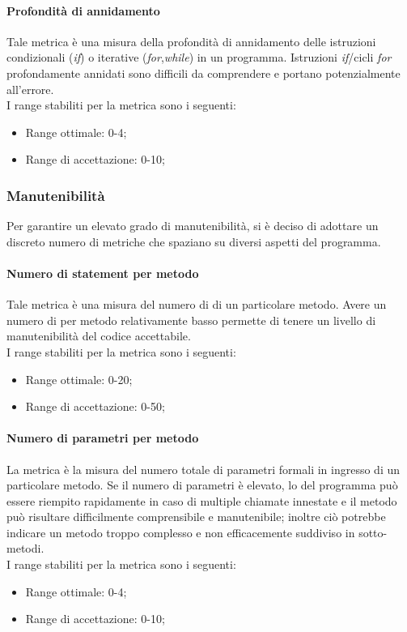 			\paragraph[Profondità di annidamento]{\hypertarget{pa}{Profondità di annidamento}}
			Tale metrica è una misura della profondità di annidamento delle istruzioni condizionali (\textit{if}) o iterative (\textit{for},\textit{while}) in un programma. Istruzioni \textit{if}/cicli \textit{for} profondamente annidati sono difficili da comprendere e portano potenzialmente all'errore.
			\\I range stabiliti per la metrica sono i seguenti:
			\begin{itemize}
				\item Range ottimale: 0-4;
				\item Range di accettazione: 0-10;
			\end{itemize}

		\subsubsection{Manutenibilità \label{S4}}
		Per garantire un elevato grado di manutenibilità, si è deciso di adottare un discreto numero di metriche che spaziano su diversi aspetti del programma.
			\paragraph[Numero di statement per metodo]{\hypertarget{nsm}{Numero di statement per metodo}}
			Tale metrica è una misura del numero di  di un particolare metodo. Avere un numero di  per metodo relativamente basso permette di tenere un livello di manutenibilità del codice accettabile.
			\\I range stabiliti per la metrica sono i seguenti:
			\begin{itemize}
				\item Range ottimale: 0-20;
				\item Range di accettazione: 0-50;
			\end{itemize}
			
			\paragraph[Numero di parametri per metodo]{\hypertarget{npm}{Numero di parametri per metodo}}
			La metrica è la misura del numero totale di parametri formali in ingresso di un particolare metodo. Se il numero di parametri è elevato, lo  del programma può essere riempito rapidamente in caso di multiple chiamate innestate e il metodo può risultare difficilmente comprensibile e manutenibile; inoltre ciò potrebbe indicare un metodo troppo complesso e non efficacemente suddiviso in sotto-metodi.
			\\I range stabiliti per la metrica sono i seguenti:
			\begin{itemize}
				\item Range ottimale: 0-4;
				\item Range di accettazione: 0-10;
			\end{itemize}
			
